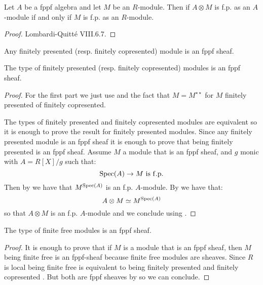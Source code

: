 \begin{lemma}\label{fp-stable-fppf-tensor}
Let $A$ be a fppf algebra and let $M$ be an $R$-module. Then if $A\otimes M$ is f.p. as an $A$-module if and only if $M$ is f.p. as an $R$-module.
\end{lemma}

\begin{proof}
Lombardi-Quitté VIII.6.7.
\end{proof}

\begin{lemma}\label{descent-fp-fcop}
Any finitely presented (resp. finitely copresented) module is an fppf sheaf.

The type of finitely presented (resp. finitely copresented) modules is an fppf sheaf.
\end{lemma}

\begin{proof}
For the first part we just use  and the fact that $M=M^{\star\star}$ for $M$ finitely presented of finitely copresented.

The types of finitely presented and finitely copresented modules are equivalent so it is enough to prove the result for finitely presented modules. Since any finitely presented module is an fppf sheaf it is enough to prove that being finitely presented is an fppf sheaf. Assume $M$ a module that is an fppf sheaf, and $g$ monic with $A=R[X]/g$ such that:
\[\Spec(A)\to M\ \mathrm{is\ f.p.}\]
Then by  we have that $M^{\operatorname{Spec}(A)}$ is an f.p. $A$-module. By  we have that:
\[A\otimes M \simeq M^{\operatorname{Spec}(A)}\]
so that $A\otimes M$ is an f.p. $A$-module and we conclude using .
\end{proof}

\begin{proposition}\label{descent-finite-free}
The type of finite free modules is an fppf sheaf.
\end{proposition}

\begin{proof}
It is enough to prove that if $M$ is a module that is an fppf sheaf, then $M$ being finite free is an fppf-sheaf because finite free modules are sheaves. Since $R$ is local being finite free is equivalent to being finitely presented and finitely copresented \cite{TODO}. But both are fppf sheaves by  so we can conclude.
\end{proof}


